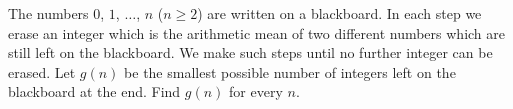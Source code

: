 The numbers $ 0$,  $ 1$,  $ \dots$,  $ n$ ($ n \ge 2$) are written on a blackboard. In each step we erase an integer which is the arithmetic mean of two different numbers which are still left on the blackboard. We make such steps until no further integer can be erased. Let $ g(n)$ be the smallest possible number of integers left on the blackboard at the end. Find $ g(n)$ for every $ n$.